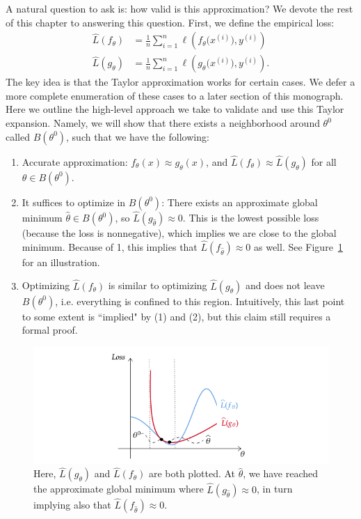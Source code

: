 A natural question to ask is: how valid is this approximation? We devote the rest of this chapter to answering this question. First, we define the empirical loss: 
\begin{align}
    \hat{L}(f_\theta) & = \frac{1}{n}\sum_{i=1}^n \ell \left( f_\theta\big( x^{(i)} \big) , y^{(i)} \right) \\ 
    \hat{L}(g_\theta) & = \frac{1}{n}\sum_{i=1}^n \ell \left( g_\theta\big( x^{(i)} \big) , y^{(i)} \right).
\end{align} 
The key idea is that the Taylor approximation works for certain cases. We defer a more complete enumeration of these cases to a later section of this monograph. Here we outline the high-level approach we take to validate and use this Taylor expansion. Namely, we will show that there exists a neighborhood around $\theta^0$ called $B(\theta^0)$, such that we have the following:
\begin{enumerate}
    \item Accurate approximation: $f_\theta(x) \approx g_\theta(x)$, and $\hat{L}(f_\theta) \approx \hat{L}(g_\theta)$ for all $\theta \in B(\theta^0)$.
    \item It suffices to optimize in $B(\theta^0)$: There exists an approximate global minimum $\hat{\theta} \in B(\theta^0)$, so $\hat{L}(g_{\hat{\theta}}) \approx 0$. This is the lowest possible loss (because the loss is nonnegative), which implies we are close to the global minimum. Because of 1, this implies that $\hat{L}(f_{\hat{\theta}}) \approx 0$ as well. See Figure~\ref{lec13:fig:ntkglobalmin} for an illustration.
    \item Optimizing $\hat{L} (f_\theta)$ is similar to optimizing $\hat{L}(g_\theta)$ and does not leave $B(\theta^0)$, i.e. everything is confined to this region. Intuitively, this last point to some extent is ``implied" by (1) and (2), but this claim still requires a formal proof. 
\end{enumerate}

\begin{figure}[h!]
    \centering
    \includegraphics[scale=0.5]{figures/ntk_global_min.png}
    \caption{Here, $\hat{L}(g_{\theta})$ and $\hat{L}(f_{\theta})$ are both plotted. At $\hat{\theta}$, we have reached the approximate global minimum where $\hat{L}(g_{\hat{\theta}}) \approx 0$, in turn implying also that $\hat{L}(f_{\hat{\theta}}) \approx 0$.}
    \label{lec13:fig:ntkglobalmin}
\end{figure}

